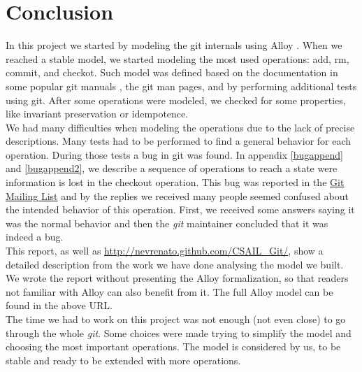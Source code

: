 \chapter{Conclusion}
In this project we started by modeling the git internals using Alloy
\cite{Jackson:2006:SAL:1146359}. When we reached
a stable model, we started modeling the most used operations:
add, rm, commit, and checkot. Such model was defined based on the
documentation in some popular git manuals \cite{gitComm,progit}, the git man pages,
and by performing additional tests using git. After some operations were
modeled, we checked for some properties, like invariant
preservation or idempotence.\\

We had many difficulties when modeling the operations due to the lack of precise descriptions. 
Many tests had to be performed to find a general behavior for each
operation. During those tests a bug in git was found. In appendix
\ref{bugappend} and \ref{bugappend2}, we describe a
sequence of operations to reach a state were information is lost in the
checkout operation. This
bug was reported in the \href{mailto:git@vger.kernel.org}{Git Mailing
List} and by the replies we received many people seemed confused about
the intended behavior of this operation. First, we received some answers saying it
was the normal behavior and then the \emph{git} maintainer concluded that
it was indeed a bug.\\

This report, as well as
\href{http://nevrenato.github.com/CSAIL_Git/}{http://nevrenato.github.com/CSAIL\_Git/},
show a detailed description from the work we have done analysing the
model we built. We wrote the report without presenting the Alloy
formalization, so that readers not familiar with Alloy can also
benefit from it. The full Alloy model can be found in the above URL.\\

The time we had to work on this project was not enough (not even close) to
go through the whole \emph{git}. Some choices were made trying to
simplify the model and choosing the most important operations. The
model is considered by us, to be stable and ready to be extended with
more operations.\\
